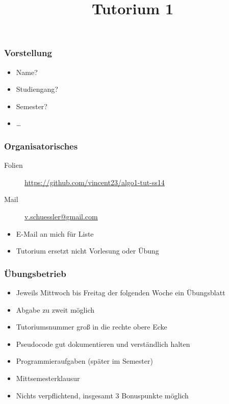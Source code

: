 
\title[Algorithmen I SS 14]{Tutorium 1}



\begin{frame}
  \maketitle
\end{frame}

\begin{frame}
	\frametitle{Vorstellung}
	\begin{itemize}
		\item Name?
		\item Studiengang?
		\item Semester?
		\item …
	\end{itemize}
\end{frame}

\begin{frame}
	\frametitle{Organisatorisches}
	\begin{description}
		\item[Folien] \url{https://github.com/vincent23/algo1-tut-ss14}
		\item[Mail] \href{mailto:v.schuessler@gmail.com}{v.schuessler@gmail.com}
	\end{description}

	\begin{itemize}
		\item E-Mail an mich für Liste
		\item Tutorium ersetzt nicht Vorlesung oder Übung
	\end{itemize}
\end{frame}

\begin{frame}
	\frametitle{Übungsbetrieb}
	\begin{itemize}
		\item Jeweils Mittwoch bis Freitag der folgenden Woche ein Übungsblatt
		\item Abgabe zu zweit möglich
		\item Tutoriumsnummer groß in die rechte obere Ecke
		\item Pseudocode gut dokumentieren und verständlich halten
		\item Programmieraufgaben (später im Semester)
		\item Mittsemesterklausur
		\item Nichts verpflichtend, insgesamt 3 Bonuspunkte möglich
	\end{itemize}
\end{frame}

